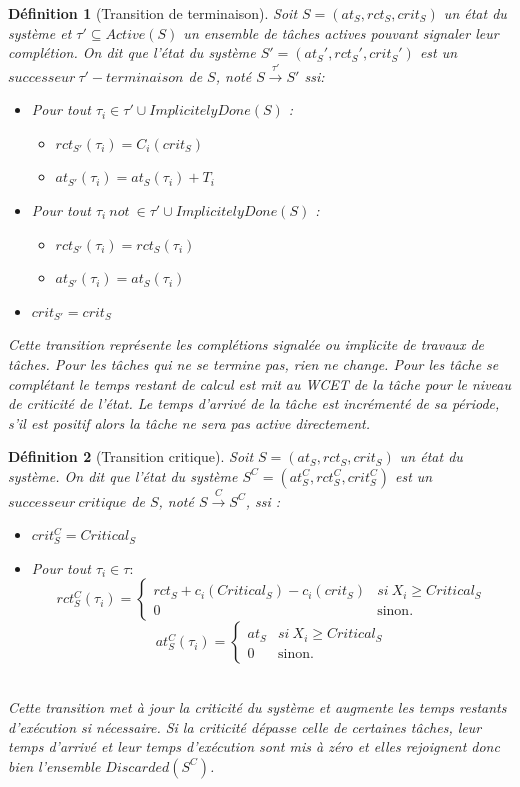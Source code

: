 \documentclass[11pt,a4paper,oneside]{book}
\theoremstyle{break}
\newtheorem{defin}{Définition}
\theoremstyle{breakplain}
\begin{document}
\begin{defin}[Transition de terminaison]
Soit $S = (at_S, rct_S, crit_S)$ un état du système et $\tau' \subseteq Active(S)$ un ensemble de tâches actives pouvant signaler leur complétion. On dit que l'état du système $S' = (at_S', rct_S', crit_S')$ est un $successeur\ \tau'-terminaison$ de $S$, noté $S\xrightarrow{\tau'}S'$ ssi:
\begin{itemize}
\item Pour tout $\tau_i \in \tau' \cup ImplicitelyDone(S)$ :\begin{itemize}
\item $rct_{S'}(\tau_i) = C_i(crit_S)$
\item $at_{S'}(\tau_i) = at_{S}(\tau_i)+T_i$
\end{itemize}

\item Pour tout $\tau_i\ not\ \in \tau' \cup ImplicitelyDone(S)$ :\begin{itemize}
\item $rct_{S'}(\tau_i) = rct_{S}(\tau_i)$
\item $at_{S'}(\tau_i) = at_{S}(\tau_i)$
\end{itemize}
\item $crit_{S'} = crit_{S}$

\end{itemize}
Cette transition représente les complétions signalée ou implicite de travaux de tâches. Pour les tâches qui ne se termine pas, rien ne change. Pour les tâche se complétant le temps restant de calcul est mit au WCET de la tâche pour le niveau de criticité de l'état. Le temps d'arrivé de la tâche est incrémenté de sa période, s'il est positif alors la tâche ne sera pas active directement.
\end{defin}

\begin{defin}[Transition critique]
Soit $S = (at_S, rct_S, crit_S)$ un état du système. On dit que l'état du système $S^C = (at_S^C, rct_S^C, crit_S^C)$ est un $successeur\ critique$ de $S$, noté $S\xrightarrow{C}S^C$, ssi :
\begin{itemize}
\item $crit_S^C = Critical_S$
\item Pour tout $\tau_i \in \tau :$
$$ rct_S^C(\tau_i) = \left\{
    \begin{array}{ll}
        rct_S+c_i(Critical_S)-c_i(crit_S) & si\ X_i\geq Critical_S \\
        0 & \mbox{sinon.}
    \end{array}
\right.
$$
$$ at_S^C(\tau_i) = \left\{
    \begin{array}{ll}
        at_S & si\ X_i\geq Critical_S \\
        0 & \mbox{sinon.}
    \end{array}
\right.
$$\\
\end{itemize}
Cette transition met à jour la criticité du système et augmente les temps restants d'exécution si nécessaire. Si la criticité dépasse celle de certaines tâches, leur temps d'arrivé et leur temps d'exécution sont mis à zéro et elles rejoignent donc bien l'ensemble $Discarded(S^C)$.
\end{defin}
\end{document}
